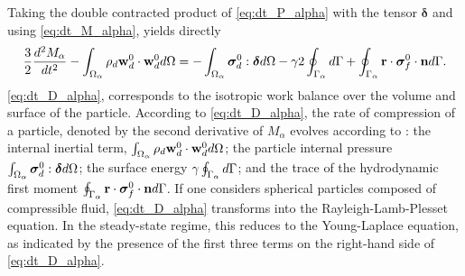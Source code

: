 Taking the double contracted product of \ref{eq:dt_P_alpha} with the tensor $\bm\delta$ and using \ref{eq:dt_M_alpha}, yields directly  
\begin{equation}
    \frac{3}{2}\frac{d^2 M_\alpha}{dt^2}
    - \int_{\Omega_{\alpha}}  \rho_d \textbf{w}_d^0 \cdot \textbf{w}_d^0 d\Omega
    = 
    - \int_{\Omega_{\alpha}} \bm\sigma_d^0:\bm\delta d\Omega 
    - \gamma 2 \oint_{\Gamma_{\alpha}}  d\Gamma
    + \oint_{\Gamma_{\alpha}} \textbf{r}\cdot\bm\sigma_f^0\cdot \textbf{n} d\Gamma.
    \label{eq:dt_D_alpha}
\end{equation}
\ref{eq:dt_D_alpha}, corresponds to the isotropic work balance over the volume and surface of the particle. 
According to \ref{eq:dt_D_alpha}, the rate of compression of a particle, denoted by the second derivative of $M_\alpha$ evolves according to : 
the internal inertial term, $\int_{\Omega_{\alpha}} \rho_d \textbf{w}_d^0 \cdot \textbf{w}_d^0  d\Omega$;
the particle internal pressure $\int_{\Omega_{\alpha}} \bm\sigma_d^0:\bm\delta d\Omega$; 
the surface energy $\gamma\oint_{\Gamma_{\alpha}}    d\Gamma$; 
and the trace of the hydrodynamic first moment $\oint_{\Gamma_{\alpha}} \textbf{r}\cdot\bm\sigma_f^0\cdot \textbf{n} d\Gamma$.
If one considers spherical particles composed of compressible fluid, \ref{eq:dt_D_alpha} transforms into the Rayleigh-Lamb-Plesset equation. 
In the steady-state regime, this reduces to the Young-Laplace equation, as indicated by the presence of the first three terms on the right-hand side of \ref{eq:dt_D_alpha}. 

